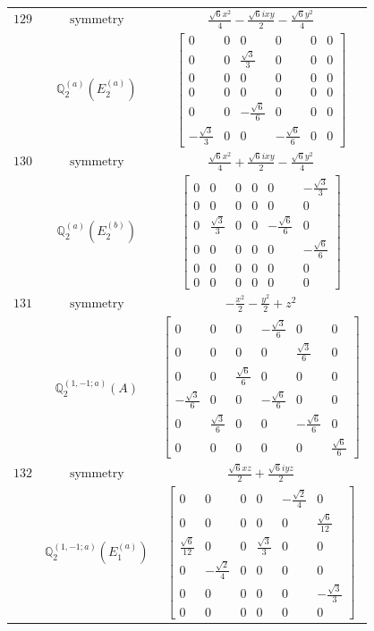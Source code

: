 \documentclass[fleqn,8pt,landscape]{jsarticle}
\begin{document}
\begin{longtable}{ccc}
$ 129 $ & $ \text{symmetry} $ & $ \frac{\sqrt{6} x^{2}}{4} - \frac{\sqrt{6} i x y}{2} - \frac{\sqrt{6} y^{2}}{4} $ \\
$  $ & $ \mathbb{Q}_{2}^{(a)}(E_{2}^{(a)}) $ & $ \begin{bmatrix} 0 & 0 & 0 & 0 & 0 & 0 \\ 0 & 0 & \frac{\sqrt{3}}{3} & 0 & 0 & 0 \\ 0 & 0 & 0 & 0 & 0 & 0 \\ 0 & 0 & 0 & 0 & 0 & 0 \\ 0 & 0 & - \frac{\sqrt{6}}{6} & 0 & 0 & 0 \\ - \frac{\sqrt{3}}{3} & 0 & 0 & - \frac{\sqrt{6}}{6} & 0 & 0 \end{bmatrix} $ \\ \hline
$ 130 $ & $ \text{symmetry} $ & $ \frac{\sqrt{6} x^{2}}{4} + \frac{\sqrt{6} i x y}{2} - \frac{\sqrt{6} y^{2}}{4} $ \\
$  $ & $ \mathbb{Q}_{2}^{(a)}(E_{2}^{(b)}) $ & $ \begin{bmatrix} 0 & 0 & 0 & 0 & 0 & - \frac{\sqrt{3}}{3} \\ 0 & 0 & 0 & 0 & 0 & 0 \\ 0 & \frac{\sqrt{3}}{3} & 0 & 0 & - \frac{\sqrt{6}}{6} & 0 \\ 0 & 0 & 0 & 0 & 0 & - \frac{\sqrt{6}}{6} \\ 0 & 0 & 0 & 0 & 0 & 0 \\ 0 & 0 & 0 & 0 & 0 & 0 \end{bmatrix} $ \\ \hline
$ 131 $ & $ \text{symmetry} $ & $ - \frac{x^{2}}{2} - \frac{y^{2}}{2} + z^{2} $ \\
$  $ & $ \mathbb{Q}_{2}^{(1,-1;a)}(A) $ & $ \begin{bmatrix} 0 & 0 & 0 & - \frac{\sqrt{3}}{6} & 0 & 0 \\ 0 & 0 & 0 & 0 & \frac{\sqrt{3}}{6} & 0 \\ 0 & 0 & \frac{\sqrt{6}}{6} & 0 & 0 & 0 \\ - \frac{\sqrt{3}}{6} & 0 & 0 & - \frac{\sqrt{6}}{6} & 0 & 0 \\ 0 & \frac{\sqrt{3}}{6} & 0 & 0 & - \frac{\sqrt{6}}{6} & 0 \\ 0 & 0 & 0 & 0 & 0 & \frac{\sqrt{6}}{6} \end{bmatrix} $ \\ \hline
$ 132 $ & $ \text{symmetry} $ & $ \frac{\sqrt{6} x z}{2} + \frac{\sqrt{6} i y z}{2} $ \\
$  $ & $ \mathbb{Q}_{2}^{(1,-1;a)}(E_{1}^{(a)}) $ & $ \begin{bmatrix} 0 & 0 & 0 & 0 & - \frac{\sqrt{2}}{4} & 0 \\ 0 & 0 & 0 & 0 & 0 & \frac{\sqrt{6}}{12} \\ \frac{\sqrt{6}}{12} & 0 & 0 & \frac{\sqrt{3}}{3} & 0 & 0 \\ 0 & - \frac{\sqrt{2}}{4} & 0 & 0 & 0 & 0 \\ 0 & 0 & 0 & 0 & 0 & - \frac{\sqrt{3}}{3} \\ 0 & 0 & 0 & 0 & 0 & 0 \end{bmatrix} $ \\ \hline

\end{longtable}
\end{document}
